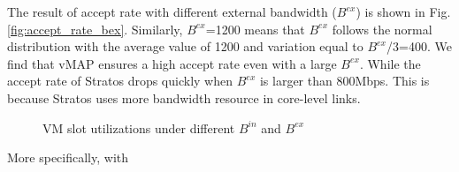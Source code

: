 \documentclass[review]{elsarticle}
\begin{document}
The result of accept rate with different external bandwidth ($B^{ex}$) is shown in Fig. \ref{fig:accept_rate_bex}. Similarly, $B^{ex}$=1200 means that $B^{ex}$ follows the normal distribution with the average value of 1200 and variation equal to $B^{ex}$/3=400. We find that vMAP ensures a high accept rate even with a large $B^{ex}$.
While the accept rate of Stratos drops quickly when $B^{ex}$ is larger than 800Mbps. This is because Stratos uses more bandwidth resource in core-level links. 
\begin{figure}[h]
	\centering	
	\caption{VM slot utilizations under different $B^{in}$ and $B^{ex}$}
	\label{fig:vm_util}
\end{figure}
More specifically, with
\end{document}
